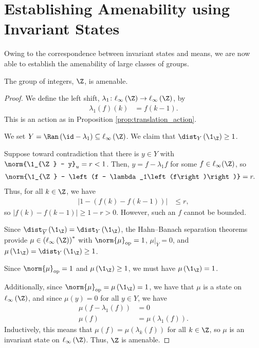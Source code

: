 \section{Establishing Amenability using Invariant States}%
Owing to the correspondence between invariant states and means, we are now able to establish the amenability of large classes of groups.
\begin{proposition}
  The group of integers, $\Z$, is amenable.
\end{proposition}
\begin{proof}
  We define the left shift, $\lambda_1\colon \ell_{\infty}\left(\Z\right) \rightarrow \ell_{\infty}\left(\Z\right)$, by
  \begin{align*}
    \lambda_1\left(f\right)\left(k\right) &= f\left(k-1\right).
  \end{align*}
  This is an action as in Proposition \ref{prop:translation_action}. \newline

  We set $Y = \Ran\left(\id - \lambda_1\right)\subseteq \ell_{\infty}\left(\Z\right)$. We claim that $\dist_{Y}\left(\1_{\Z}\right) \geq 1$.\newline

  Suppose toward contradiction that there is $y\in Y$ with $\norm{\1_{\Z} - y}_{u} = r < 1$. Then, $y = f - \lambda_1 f$ for some $f\in \ell_{\infty}(\Z)$, so
  \begin{align*}
    \norm{\1_{\Z} - \left(f - \lambda_1\left(f\right)\right)} &= r.
  \end{align*}
  Thus, for all $k\in\Z$, we have
  \begin{align*}
    \left\vert 1 - \left(f(k) - f(k-1)\right) \right\vert &\leq r,
  \end{align*}
  so $\left\vert f(k) - f\left(k-1\right) \right\vert \geq 1-r > 0$. However, such an $f$ cannot be bounded.\newline

  Since $\dist_{\overline{Y}}\left(\1_{\Z}\right) = \dist_{Y}\left(\1_{\Z}\right)$, the Hahn--Banach separation theorems provide $\mu\in \left(\ell_{\infty}\left(\Z\right)\right)^{\ast}$ with $\norm{\mu}_{\op} = 1$, $\mu|_{\overline{Y}} = 0$, and $\mu\left(\1_{\Z}\right) = \dist_{Y}\left(\1_{\Z}\right) \geq 1$.\newline

  Since $\norm{\mu}_{\op} = 1$ and $\mu\left(\1_{\Z}\right) \geq 1$, we must have $\mu\left(\1_{\Z}\right) = 1$.\newline

  Additionally, since $\norm{\mu}_{\op} = \mu\left(\1_{\Z}\right) = 1$, we have that $\mu$ is a state on $\ell_{\infty}\left(\Z\right)$, and since $\mu\left(y\right) = 0$ for all $y\in Y$, we have
  \begin{align*}
    \mu\left(f - \lambda_1\left(f\right)\right) &= 0\\
    \mu\left(f\right) &= \mu\left(\lambda_1\left(f\right)\right).
  \end{align*}
  Inductively, this means that $\mu\left(f\right) = \mu\left(\lambda_k\left(f\right)\right)$ for all $k\in \Z$, so $\mu$ is an invariant state on $\ell_{\infty}\left(\Z\right)$. Thus, $\Z$ is amenable.
\end{proof}
